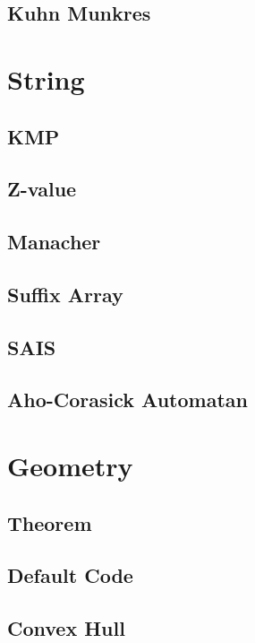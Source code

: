 \subsection{Kuhn Munkres}


\section{String}
\subsection{KMP}

\subsection{Z-value}

\subsection{Manacher}

\subsection{Suffix Array}

\subsection{SAIS}

\subsection{Aho-Corasick Automatan}


\section{Geometry}
\subsection{Theorem}

\subsection{Default Code}

\subsection{Convex Hull}

